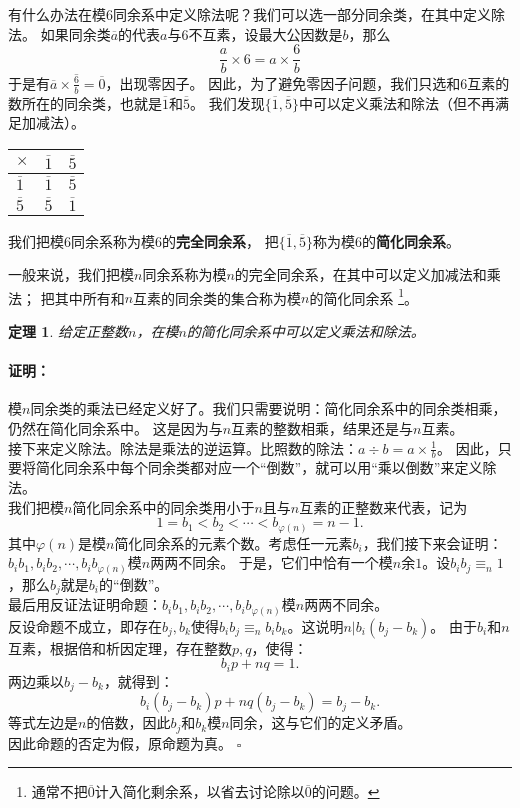 \documentclass[12pt,UTF8]{ctexbook}
\newtheorem{tm}{定理}[section]
\renewenvironment{proof}{\paragraph{\textbf{证明：}}}{\hfill$\square$}
\begin{document}
有什么办法在模$6$同余系中定义除法呢？我们可以选一部分同余类，在其中定义除法。
如果同余类$\overline{a}$的代表$a$与$6$不互素，设最大公因数是$b$，那么
$$ \frac{a}{b} \times 6 = a \times \frac{6}{b} $$
于是有$\overline{a} \times \overline{\frac{6}{b}} = \overline{0}$，出现零因子。
因此，为了避免零因子问题，我们只选和$6$互素的数所在的同余类，也就是$\overline{1}$和$\overline{5}$。
我们发现$\{\overline{1}, \overline{5}\}$中可以定义乘法和除法（但不再满足加减法）。
\begin{center}
    \begin{tabular}{ | p{2em}<{\centering} | p{2em}<{\centering} | p{2em}<{\centering} | }
        \hline
            $\times$   & $\overline{1}$ & $\overline{5}$ \\ [0.5ex] 
        \hline
        $\overline{1}$ & $\overline{1}$ & $\overline{5}$ \\
        \hline
        $\overline{5}$ & $\overline{5}$ & $\overline{1}$ \\
        \hline
    \end{tabular}
\end{center}
我们把模$6$同余系称为模$6$的\textbf{完全同余系}，
把$\{\overline{1}, \overline{5}\}$称为模$6$的\textbf{简化同余系}。

一般来说，我们把模$n$同余系称为模$n$的完全同余系，在其中可以定义加减法和乘法；
把其中所有和$n$互素的同余类的集合称为模$n$的简化同余系
\footnote{通常不把$\overline{0}$计入简化剩余系，以省去讨论除以$\overline{0}$的问题。}。

\begin{tm}\label{tm:3-2-0}
    给定正整数$n$，在模$n$的简化同余系中可以定义乘法和除法。
\end{tm}
\begin{proof}
    模$n$同余类的乘法已经定义好了。我们只需要说明：简化同余系中的同余类相乘，仍然在简化同余系中。
    这是因为与$n$互素的整数相乘，结果还是与$n$互素。\\
    接下来定义除法。除法是乘法的逆运算。比照数的除法：$a \div b = a \times \frac{1}{b}$。
    因此，只要将简化同余系中每个同余类都对应一个“倒数”，就可以用“乘以倒数”来定义除法。\\
    我们把模$n$简化同余系中的同余类用小于$n$且与$n$互素的正整数来代表，记为
    $$1 = b_1 < b_2 < \cdots < b_{\varphi(n)} = n-1.$$
    其中$\varphi(n)$是模$n$简化同余系的元素个数。考虑任一元素$b_i$，我们接下来会证明：
    $b_ib_1, b_ib_2, \cdots, b_ib_{\varphi(n)}$模$n$两两不同余。
    于是，它们中恰有一个模$n$余$1$。设$b_ib_j \equiv_n 1$，那么$b_j$就是$b_i$的“倒数”。\\
    最后用反证法证明命题：$b_ib_1, b_ib_2, \cdots, b_ib_{\varphi(n)}$模$n$两两不同余。\\
    反设命题不成立，即存在$b_j, b_k$使得$b_ib_j \equiv_n b_ib_k$。这说明$n | b_i(b_j - b_k)$。
    由于$b_i$和$n$互素，根据倍和析因定理，存在整数$p, q$，使得：
    $$ b_ip + nq = 1.$$
    两边乘以$b_j - b_k$，就得到：
    $$ b_i(b_j - b_k)p + nq(b_j - b_k) = b_j - b_k.$$
    等式左边是$n$的倍数，因此$b_j$和$b_k$模$n$同余，这与它们的定义矛盾。\\
    因此命题的否定为假，原命题为真。
\end{proof}
\end{document}
